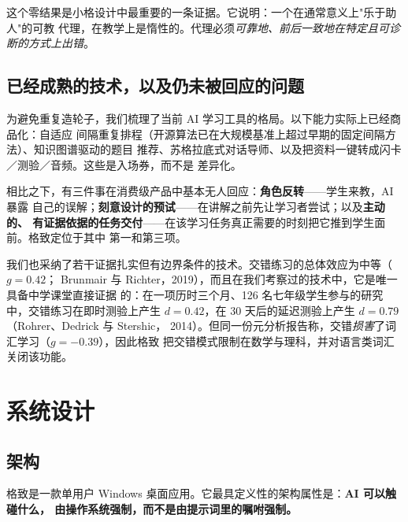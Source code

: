 \documentclass[11pt,a4paper,UTF8,fontset=windows]{ctexart}
\begin{document}
这个零结果是小格设计中最重要的一条证据。它说明：一个在通常意义上"乐于助人"的可教
代理，在教学上是惰性的。代理必须\emph{可靠地、前后一致地在特定且可诊断的方式上出错}。

\subsection{已经成熟的技术，以及仍未被回应的问题}

为避免重复造轮子，我们梳理了当前 AI 学习工具的格局。以下能力实际上已经商品化：自适应
间隔重复排程（开源算法已在大规模基准上超过早期的固定间隔方法）、知识图谱驱动的题目
推荐、苏格拉底式对话导师、以及把资料一键转成闪卡／测验／音频。这些是入场券，而不是
差异化。

相比之下，有三件事在消费级产品中基本无人回应：\textbf{角色反转}——学生来教，AI 暴露
自己的误解；\textbf{刻意设计的预试}——在讲解之前先让学习者尝试；以及\textbf{主动的、
有证据依据的任务交付}——在该学习任务真正需要的时刻把它推到学生面前。格致定位于其中
第一和第三项。

我们也采纳了若干证据扎实但有边界条件的技术。交错练习的总体效应为中等（\(g = 0.42\)；
Brunmair 与 Richter，2019），而且在我们考察过的技术中，它是唯一具备中学课堂直接证据
的：在一项历时三个月、126 名七年级学生参与的研究中，交错练习在即时测验上产生
\(d = 0.42\)，在 30 天后的延迟测验上产生 \(d = 0.79\)（Rohrer、Dedrick 与 Stershic，
2014）。但同一份元分析报告称，交错\emph{损害}了词汇学习（\(g = -0.39\)），因此格致
把交错模式限制在数学与理科，并对语言类词汇关闭该功能。

\section{系统设计}

\subsection{架构}

格致是一款单用户 Windows 桌面应用。它最具定义性的架构属性是：\textbf{AI 可以触碰什么，
由操作系统强制，而不是由提示词里的嘱咐强制。}
\end{document}
